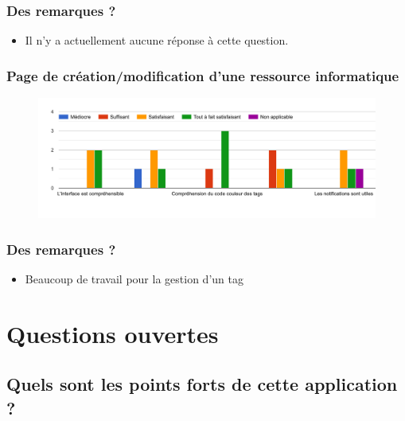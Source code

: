 \subsubsection*{Des remarques ?}

\begin{itemize}
    \item Il n'y a actuellement aucune réponse à cette question.
\end{itemize}

\subsubsection*{Page de création/modification d'une ressource informatique}

\begin{figure}[H]
    \includegraphics[width=\textwidth,height=0.3\textheight,keepaspectratio]{images/googleForm/creationModifResInfo_2.png}
    \centering
\end{figure}

\subsubsection*{Des remarques ?}

\begin{itemize}
    \item Beaucoup de travail pour la gestion d'un tag
\end{itemize}

\section{Questions ouvertes}

\subsection*{Quels sont les points forts de cette application ?}

